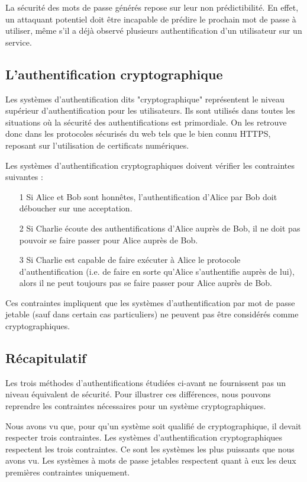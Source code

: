 	La sécurité des mots de passe générés repose sur leur non prédictibilité.
	En effet, un attaquant potentiel doit être incapable de prédire le
	prochain mot de passe à utiliser, même s'il a déjà observé plusieurs
	authentification d'un utilisateur sur un service.

\subsection{L'authentification cryptographique}

	Les systèmes d'authentification dits "cryptographique" représentent le
	niveau supérieur d'authentification pour les utilisateurs. Ils sont
	utilisés dans toutes les situations où la sécurité des authentifications
	est primordiale. On les retrouve donc dans les protocoles sécurisés du web
	tels que le bien connu HTTPS, reposant sur l'utilisation de certificats
	numériques.

	Les systèmes d'authentification cryptographiques doivent vérifier les
	contraintes suivantes \cite{Auth} :
	\begin{itemize}
	  \item[1] Si Alice et Bob sont honnêtes, l'authentification d'Alice par
	  Bob doit déboucher sur une acceptation.
	  \item[2] Si Charlie écoute des authentifications d'Alice auprès de Bob,
	  il ne doit pas pouvoir se faire passer pour Alice auprès de Bob.
	  \item[3] Si Charlie est capable de faire exécuter à Alice le protocole
	  d'authentification (i.e. de faire en sorte qu'Alice s'authentifie auprès
	  de lui), alors il ne peut toujours pas se faire passer pour Alice auprès
	  de Bob.
	\end{itemize}

  Ces contraintes impliquent que les systèmes d'authentification par mot de
  passe jetable (sauf dans certain cas particuliers) ne peuvent pas être
  considérés comme cryptographiques.

\subsection{Récapitulatif}

	Les trois méthodes d'authentifications étudiées ci-avant ne fournissent
	pas un niveau équivalent de sécurité. Pour illustrer ces différences, nous
	pouvons reprendre les contraintes nécessaires pour un système
	cryptographiques.

	Nous avons vu que, pour qu'un système soit qualifié de cryptographique, il
	devait respecter trois contraintes. Les systèmes d'authentification
	cryptographiques respectent les trois contraintes. Ce sont les systèmes
	les plus puissants que nous avons vu. Les systèmes à mots de passe
	jetables respectent quant à eux les deux premières contraintes uniquement.

